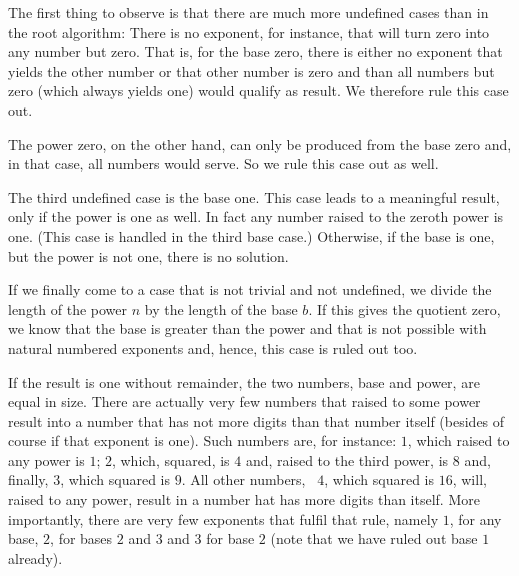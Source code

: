 \documentclass{scrreprt}
\newcommand{\Varid}[1]{\mathit{#1}}
\begin{document}
{The first thing to observe is that there are much
more undefined cases than in the root algorithm:
There is no exponent, for instance, that will turn zero
into any number but zero.
That is, for the base zero, there is either no exponent
that yields the other number or that other number is zero
and than all numbers but zero (which always yields one)
would qualify as result. We therefore rule this case out.

The power zero, on the other hand,
can only be produced from the base zero and, in that case,
all numbers would serve. So we rule this case out as well.

The third undefined case is the base one.
This case leads to a meaningful result, only if
the power is one as well. In fact any number raised
to the zeroth power is one.
(This case is handled in the third base case.)
Otherwise, if the base is one, but the power is not one,
there is no solution.

If we finally come to a case that is not trivial and not undefined,
we divide the length of the power \ensuremath{\Varid{n}} by the length of the base \ensuremath{\Varid{b}}.
If this gives the quotient zero,
we know that the base is greater than the power
and that is not possible with natural numbered exponents
and, hence, this case is ruled out too.

If the result is one without remainder, 
the two numbers, base and power, are equal in size.
There are actually very few numbers that raised to some power
result into a number that has not more digits 
than that number itself (besides of course 
if that exponent is one).
Such numbers are, for instance:
\ensuremath{\mathrm{1}}, which raised to any power is \ensuremath{\mathrm{1}};
\ensuremath{\mathrm{2}}, which, squared, is \ensuremath{\mathrm{4}} and, raised to the third power,
is \ensuremath{\mathrm{8}} and, finally,
\ensuremath{\mathrm{3}}, which squared is \ensuremath{\mathrm{9}}.
All other numbers, \eg\ \ensuremath{\mathrm{4}}, which squared is \ensuremath{\mathrm{16}},
will, raised to any power, result in a number
hat has more digits than itself.
More importantly,
there are very few exponents that fulfil that rule,
namely \ensuremath{\mathrm{1}}, for any base, \ensuremath{\mathrm{2}}, for bases \ensuremath{\mathrm{2}} and \ensuremath{\mathrm{3}}
and \ensuremath{\mathrm{3}} for base \ensuremath{\mathrm{2}} (note that we have ruled out
base \ensuremath{\mathrm{1}} already).

}
\end{document}
